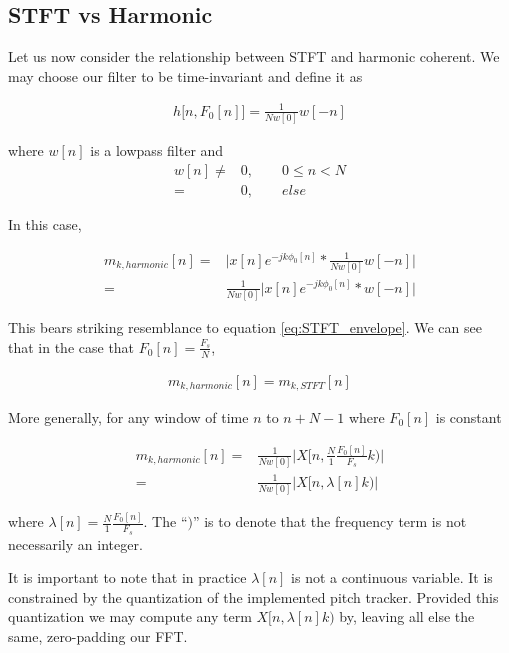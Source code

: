 \documentclass [11pt, proquest,oneside] {uwthesis}[2015/03/03]
\begin{document}
\subsection{STFT vs Harmonic}

Let us now consider the relationship between STFT and harmonic coherent.  We may choose our filter to be time-invariant and define it as

\begin{align}
h\big[n, F_0[n] \big] = \frac{1}{Nw[0]} w[-n]
\end{align}

where $w[n]$ is a lowpass filter and 
\begin{align}
w[n] \neq& 0, \qquad 0 \leq n < N \nonumber \\
=& 0, \qquad else
\end{align}

In this case,

\begin{align}
m_{k,harmonic}[n] =& \Big| x[n] e^{-jk\phi_0 [n]} *  \frac{1}{Nw[0]} w[-n] \Big|  \nonumber \\
=& \frac{1}{Nw[0]} \Big| x[n] e^{-jk\phi_0 [n]} *  w[-n] \Big|
\end{align}

This bears striking resemblance to equation \ref{eq:STFT_envelope}.  We can see that in the case that $F_0[n] = \frac{F_s}{N}$,

\begin{align}
m_{k,harmonic}[n] = m_{k,STFT}[n]
\end{align}

More generally, for any window of time $n$ to $n + N - 1$ where $F_0[n]$ is constant

\begin{align}
m_{k,harmonic}[n] =& \frac{1}{Nw[0]} \Bigg| X\Big[n, \frac{N}{1} \frac{F_0[n]}{F_s} k \Big) \Bigg| \nonumber \\
\label{eq:harmonic-to-stft}
=& \frac{1}{Nw[0]} \Bigg| X\Big[n, \lambda[n]k\Big) \Bigg|
\end{align}

where $\lambda[n] = \frac{N}{1} \frac{F_0[n]}{F_s}$.  The ``$)$'' is to denote that the frequency term is not necessarily an integer.

It is important to note that in practice $\lambda[n]$ is not a continuous variable.  It is constrained by the quantization of the implemented pitch tracker.  Provided this quantization we may compute any term $X[n, \lambda[n]k)$ by, leaving all else the same, zero-padding our FFT.
\end{document}
